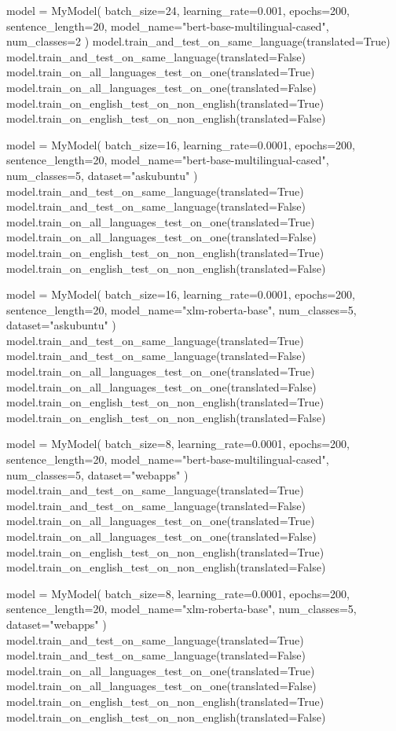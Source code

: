 \begin{python}
  model = MyModel(
    batch_size=24, learning_rate=0.001, epochs=200,
    sentence_length=20,
    model_name="bert-base-multilingual-cased",
    num_classes=2
  )
  model.train_and_test_on_same_language(translated=True)
  model.train_and_test_on_same_language(translated=False)
  model.train_on_all_languages_test_on_one(translated=True)
  model.train_on_all_languages_test_on_one(translated=False)
  model.train_on_english_test_on_non_english(translated=True)
  model.train_on_english_test_on_non_english(translated=False)

  model = MyModel(
    batch_size=16, learning_rate=0.0001, epochs=200,
    sentence_length=20,
    model_name="bert-base-multilingual-cased",
    num_classes=5,
    dataset="askubuntu"
  )
  model.train_and_test_on_same_language(translated=True)
  model.train_and_test_on_same_language(translated=False)
  model.train_on_all_languages_test_on_one(translated=True)
  model.train_on_all_languages_test_on_one(translated=False)
  model.train_on_english_test_on_non_english(translated=True)
  model.train_on_english_test_on_non_english(translated=False)

  model = MyModel(
    batch_size=16, learning_rate=0.0001, epochs=200,
    sentence_length=20,
    model_name="xlm-roberta-base",
    num_classes=5,
    dataset="askubuntu"
  )
  model.train_and_test_on_same_language(translated=True)
  model.train_and_test_on_same_language(translated=False)
  model.train_on_all_languages_test_on_one(translated=True)
  model.train_on_all_languages_test_on_one(translated=False)
  model.train_on_english_test_on_non_english(translated=True)
  model.train_on_english_test_on_non_english(translated=False)

  model = MyModel(
    batch_size=8, learning_rate=0.0001, epochs=200,
    sentence_length=20,
    model_name="bert-base-multilingual-cased",
    num_classes=5,
    dataset="webapps"
  )
  model.train_and_test_on_same_language(translated=True)
  model.train_and_test_on_same_language(translated=False)
  model.train_on_all_languages_test_on_one(translated=True)
  model.train_on_all_languages_test_on_one(translated=False)
  model.train_on_english_test_on_non_english(translated=True)
  model.train_on_english_test_on_non_english(translated=False)

  model = MyModel(
    batch_size=8, learning_rate=0.0001, epochs=200,
    sentence_length=20,
    model_name="xlm-roberta-base",
    num_classes=5,
    dataset="webapps"
  )
  model.train_and_test_on_same_language(translated=True)
  model.train_and_test_on_same_language(translated=False)
  model.train_on_all_languages_test_on_one(translated=True)
  model.train_on_all_languages_test_on_one(translated=False)
  model.train_on_english_test_on_non_english(translated=True)
  model.train_on_english_test_on_non_english(translated=False)

\end{python}
